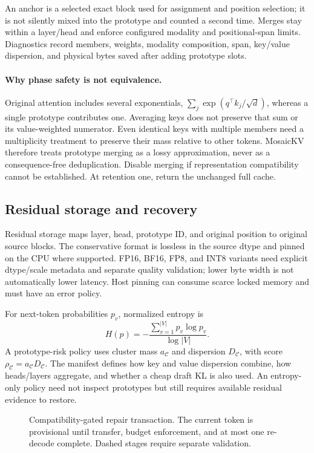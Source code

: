 An anchor is a selected exact block used for assignment and position selection;
it is not silently mixed into the prototype and counted a second time. Merges
stay within a layer/head and enforce configured modality and positional-span
limits. Diagnostics record members, weights, modality composition, span,
key/value dispersion, and physical bytes saved after adding prototype slots.

\paragraph{Why phase safety is not equivalence.}
Original attention includes several exponentials,
$\sum_j\exp(q^\top k_j/\sqrt d)$, whereas a single prototype contributes one.
Averaging keys does not preserve that sum or its value-weighted numerator.
Even identical keys with multiple members need a multiplicity treatment to
preserve their mass relative to other tokens. MosaicKV therefore treats
prototype merging as a lossy approximation, never as a consequence-free
deduplication. Disable merging if representation compatibility cannot be
established. At retention one, return the unchanged full cache.

\subsection{Residual storage and recovery}
Residual storage maps layer, head, prototype ID, and original position to
original source blocks. The conservative format is lossless in the source
dtype and pinned on the CPU where supported. FP16, BF16, FP8, and INT8 variants
need explicit dtype/scale metadata and separate quality validation; lower byte
width is not automatically lower latency. Host pinning can consume scarce
locked memory and must have an error policy.

For next-token probabilities $p_v$, normalized entropy is
\begin{equation}
 H(p)=-\frac{\sum_{v=1}^{|V|}p_v\log p_v}{\log|V|}.
\end{equation}
A prototype-risk policy uses cluster mass $a_{\mathcal C}$ and dispersion
$D_{\mathcal C}$, with score
$\rho_{\mathcal C}=a_{\mathcal C}D_{\mathcal C}$. The manifest defines how key
and value dispersion combine, how heads/layers aggregate, and whether a cheap
draft KL is also used. An entropy-only policy need not inspect prototypes but
still requires available residual evidence to restore.

\begin{figure}[t]
\centering
\caption{Compatibility-gated repair transaction. The current token is
provisional until transfer, budget enforcement, and at most one re-decode
complete. Dashed stages require separate validation.}
\label{fig:repair}
\end{figure}

